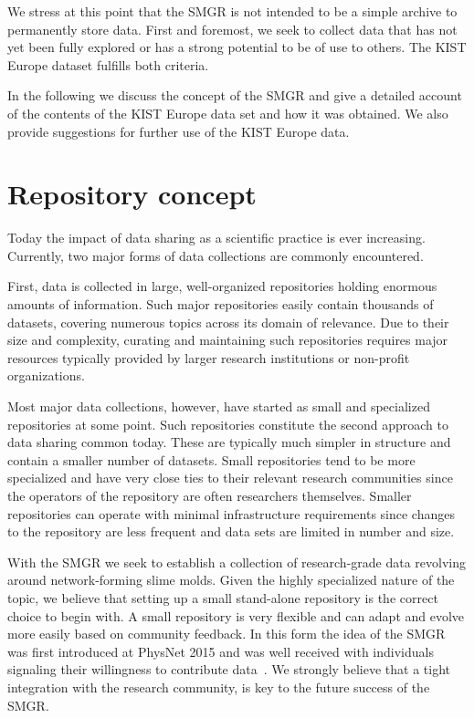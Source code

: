  	We stress at this point that the SMGR is not intended to be a simple archive to permanently store data. First and foremost, we seek to collect data that has not yet been fully explored or has a strong potential to be of use to others. The KIST Europe dataset fulfills both criteria.

 	In the following we discuss the concept of the SMGR and give a detailed account of the contents of the KIST Europe data set and how it was obtained. We also provide suggestions for further use of the KIST Europe data.

\section{Repository concept}
	
	Today the impact of data sharing as a scientific practice is ever increasing. Currently, two major forms of data collections are commonly encountered.

	First, data is collected in large, well-organized repositories holding enormous amounts of information. Such major repositories easily contain thousands of datasets, covering numerous topics across its domain of relevance. Due to their size and complexity, curating and maintaining such repositories requires major resources typically provided by larger research institutions or non-profit organizations. 

	Most major data collections, however, have started as small and specialized repositories at some point. Such repositories constitute the second approach to data sharing common today. These are typically much simpler in structure and contain a smaller number of datasets. Small repositories tend to be more specialized and have very close ties to their relevant research communities since the operators of the repository are often researchers themselves. Smaller repositories can operate with minimal infrastructure requirements since changes to the repository are less frequent and data sets are limited in number and size.

	With the SMGR we seek to establish a collection of research-grade data revolving around network-forming slime molds. Given the highly specialized nature of the topic, we believe that setting up a small stand-alone repository is the correct choice to begin with. A small repository is very flexible and can adapt and evolve more easily based on community feedback. In this form the idea of the SMGR was first introduced at PhysNet 2015 and was well received with individuals signaling their willingness to contribute data~\cite{physnet2015}. We strongly believe that a tight integration with the research community, is key to the future success of the SMGR. 


